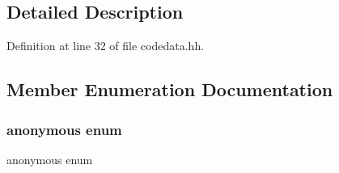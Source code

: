 \subsection{Detailed Description}


Definition at line 32 of file codedata.\+hh.



\subsection{Member Enumeration Documentation}
\mbox{\label{class_code_unit_a005eb898fbd2eb29c64d71602e623a97}} 
\subsubsection{\texorpdfstring{anonymous enum}{anonymous enum}}
{\footnotesize\ttfamily anonymous enum}

